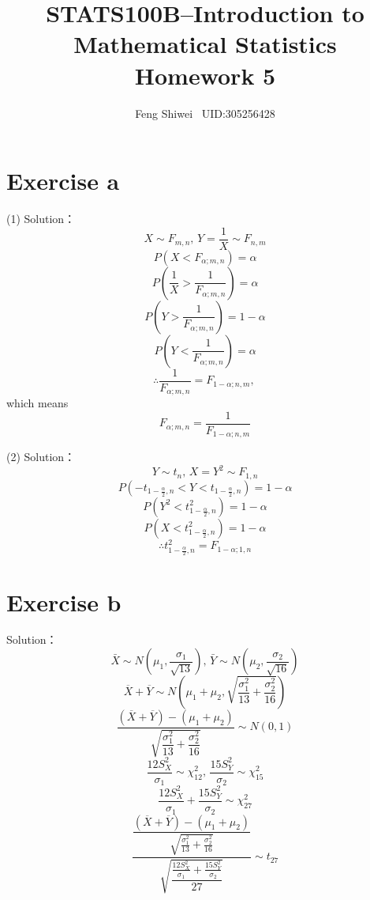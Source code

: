 \documentclass[a4papers]{ctexart}
\title{STATS100B--Introduction to Mathematical Statistics \\Homework 5}
\author{Feng Shiwei \ UID:305256428}
\date{}
\begin{document}
\maketitle
\section*{Exercise a}
\noindent(1) Solution：
\indent 
\[ X\sim F_{m,n},\, Y=\dfrac{1}{X}\sim F_{n,m}  \]
\[ P(X<F_{\alpha;m,n}) = \alpha\]
\[ P(\dfrac{1}{X} > \dfrac{1}{F_{\alpha;m,n}}) = \alpha\]
\[ P(Y > \dfrac{1}{F_{\alpha;m,n}}) = 1-\alpha\]
\[ P(Y < \dfrac{1}{F_{\alpha;m,n}}) = \alpha\]
\[ \therefore \dfrac{1}{F_{\alpha;m,n}} = F_{1-\alpha;n,m},\, \]
    which means
\[ F_{\alpha;m,n} = \dfrac{1}{F_{1-\alpha;n,m}} \]

\noindent (2) Solution：
\[ Y\sim t_n,\, X=Y^2\sim F_{1,n} \]
\[ P(-t_{1-\frac{\alpha}{2},n}<Y<t_{1-\frac{\alpha}{2},n}) = 1-\alpha \]
\[ P(Y^2 < t^2_{1-\frac{\alpha}{2},n}) = 1-\alpha \]
\[ P(X < t^2_{1-\frac{\alpha}{2},n}) = 1-\alpha \]
\[ \therefore t^2_{1-\frac{\alpha}{2},n} = F_{1-\alpha;1,n}\]

\section*{Exercise b}
\noindent Solution：\\
\[ \bar{X} \sim N(\mu_1,\dfrac{\sigma_1}{\sqrt{13}}),\,
   \bar{Y} \sim N(\mu_2,\dfrac{\sigma_2}{\sqrt{16}})\]
\[ \overline {X}+\overline {Y}\sim N\left( \mu _{1}+\mu _{2},\sqrt {\dfrac {\sigma ^{2}_{1}}{13}+\dfrac {\sigma ^{2}_{2}}{16}}\right) \]
\[ \dfrac {\left( \overline {X}+\overline {Y}\right) -\left( \mu _{1}+\mu _{2}\right) }{\sqrt {\dfrac {\sigma ^{2}_{1}}{13}+\dfrac {\sigma ^{2}_{2}}{16}}}\sim N\left( 0,1\right) \]
\[  \dfrac{12 S_X^{2}}{\sigma_1}\sim \chi^2_{12},\,
    \dfrac{15 S_Y^{2}}{\sigma_2}\sim \chi^2_{15}\]
\[  \dfrac{12 S_X^{2}}{\sigma_1} + \dfrac{15 S_Y^{2}}{\sigma_2} \sim \chi^2_{27}\]
\[  \dfrac{ \dfrac {\left( \overline {X}+\overline {Y}\right) -\left( \mu _{1}+\mu _{2}\right) }{\sqrt {\frac {\sigma ^{2}_{1}}{13}+\frac {\sigma ^{2}_{2}}{16}}}}{ \sqrt{\dfrac{\frac{12 S_X^{2}}{\sigma_1} + \frac{15 S_Y^{2}}{\sigma_2}}{27}}} \sim t_{27} \]
\end{document}
